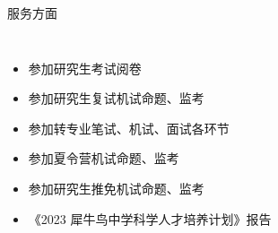 
\begin{frame}{服务方面}
  \begin{columns}
      \begin{itemize}
        \setlength{\itemsep}{10pt}
        \item 参加研究生考试阅卷
        \item 参加研究生复试机试命题、监考
        \item 参加转专业笔试、机试、面试各环节
        \item 参加夏令营机试命题、监考
        \item 参加研究生推免机试命题、监考
        \item 《2023 犀牛鸟中学科学人才培养计划》报告
      \end{itemize}
  \end{columns}
\end{frame}
